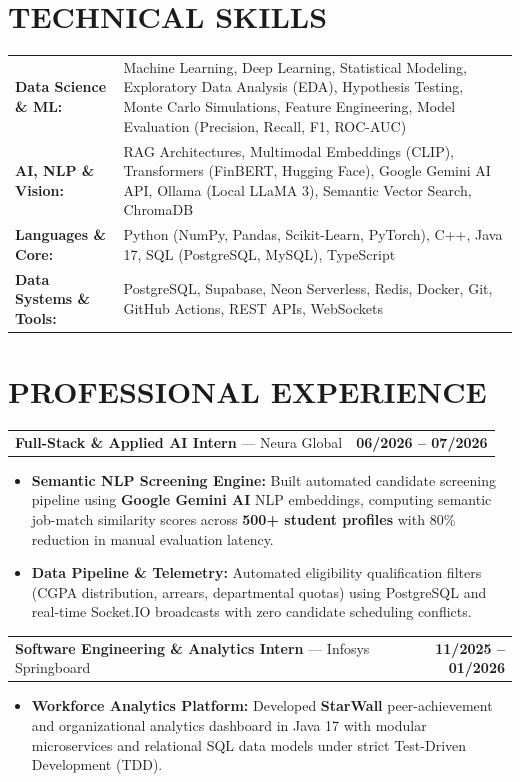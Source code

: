 \documentclass[a4paper,10pt]{article}
\begin{document}
\section{TECHNICAL SKILLS}
\begin{tabular}{@{}p{1.30in}p{6.15in}@{}}
\textbf{Data Science \& ML:} & Machine Learning, Deep Learning, Statistical Modeling, Exploratory Data Analysis (EDA), Hypothesis Testing, Monte Carlo Simulations, Feature Engineering, Model Evaluation (Precision, Recall, F1, ROC-AUC) \\
\textbf{AI, NLP \& Vision:} & RAG Architectures, Multimodal Embeddings (CLIP), Transformers (FinBERT, Hugging Face), Google Gemini AI API, Ollama (Local LLaMA 3), Semantic Vector Search, ChromaDB \\
\textbf{Languages \& Core:} & Python (NumPy, Pandas, Scikit-Learn, PyTorch), C++, Java 17, SQL (PostgreSQL, MySQL), TypeScript \\
\textbf{Data Systems \& Tools:} & PostgreSQL, Supabase, Neon Serverless, Redis, Docker, Git, GitHub Actions, REST APIs, WebSockets \\
\end{tabular}

\section{PROFESSIONAL EXPERIENCE}

\begin{tabular*}{\textwidth}{@{}l@{\extracolsep{\fill}}r@{}}
\textbf{Full-Stack \& Applied AI Intern} --- Neura Global & \textbf{06/2026 -- 07/2026} \\
\end{tabular*}
\begin{itemize}
    \item \textbf{Semantic NLP Screening Engine:} Built automated candidate screening pipeline using \textbf{Google Gemini AI} NLP embeddings, computing semantic job-match similarity scores across \textbf{500+ student profiles} with 80\% reduction in manual evaluation latency.
    \item \textbf{Data Pipeline \& Telemetry:} Automated eligibility qualification filters (CGPA distribution, arrears, departmental quotas) using PostgreSQL and real-time Socket.IO broadcasts with zero candidate scheduling conflicts.
\end{itemize}
\vspace{0.8pt}

\begin{tabular*}{\textwidth}{@{}l@{\extracolsep{\fill}}r@{}}
\textbf{Software Engineering \& Analytics Intern} --- Infosys Springboard & \textbf{11/2025 -- 01/2026} \\
\end{tabular*}
\begin{itemize}
    \item \textbf{Workforce Analytics Platform:} Developed \textbf{StarWall} peer-achievement and organizational analytics dashboard in Java 17 with modular microservices and relational SQL data models under strict Test-Driven Development (TDD).
\end{itemize}
\end{document}
